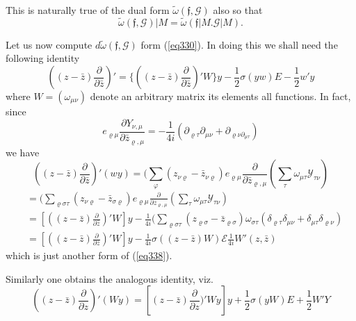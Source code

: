 This is naturally true of the dual form $\tilde{\omega } (\mathfrak{f},
\mathcal{G})$ also so that  
\begin{equation*}
\tilde{\omega} (\mathfrak{f}, \mathcal{G}) | M = \tilde {\omega}
(\mathfrak{f} | M. \mathcal{G} | M ). \tag{337}\label{eq337}   
\end{equation*}

Let us now compute $d \tilde{\omega} (\mathfrak{f}, \mathcal{G})$ form
(\ref{eq330}). In doing this we shall need the following identity  
\begin{equation*}
((z - \bar{z}) \frac{\partial }{\partial \bar{z}})' = \{((z -
  \bar{z})\frac{\partial }{\partial \bar{z}})' W  \} y - \frac{1}{2 }
  \sigma (y w ) E- \frac{1}{2} w' y \tag{338}\label{eq338}   
\end{equation*}
where $W = (\omega_{\mu \nu })$ denote an arbitrary matrix its
elements all functions. In fact, since  
$$
e_{\varrho \mu } \frac{\partial Y_{\nu, \mu }}{\partial
  \bar{z}_{\varrho, \mu } } = - \frac{1}{4i} (\partial_{\varrho \tau}
\partial_{\mu  \nu } + \partial_{\varrho \nu \partial_{\mu  \tau}}) 
$$
we have 
$$
((z - \bar{z})\frac{\partial }{\partial \bar{z} })' (w y ) = (\sum_
\varphi (z_{\nu \varrho }- \bar z_{\nu \varrho }) e_{\varrho \mu  }
\frac{\partial }{\partial \bar{z}_{\varrho, \mu } } (\sum_\tau
\omega_{\mu \tau } \mathscr{Y}_{\tau \nu }) 
$$
\begin{align*}
& = ( \sum_{\varrho \sigma \tau } (z_{\nu \varrho } - \bar z_{\sigma
    \varrho }) e_{\varrho \mu  } \frac{\partial }{\partial
    \bar{z}_{\varrho, \mu } } (\sum_\tau \omega_{\mu \tau }
  \mathscr{Y}_{\tau \nu })\\ 
 & = [((z - \bar{z}) \frac{\partial }{\partial \bar{z} })' W] y -
  \frac{1}{4i} (\sum_{\varrho \sigma \tau } (z_{\varrho \sigma } -
  \bar{z}_{\varrho \sigma }) \omega_{\sigma \tau } (\delta_{\varrho
    \tau }\delta_{\mu \nu  } + \delta_{\mu  \tau } \delta_{\varrho \nu
  })\\ 
& = [((z - \bar{z}) \frac{\partial }{\partial \bar{z} })' W] y -
  \frac{1}{4i} \sigma ((z - \bar{z}) W ) \mathcal{E} \frac{1}{4i} W'
  (z, \bar{z}) 
\end{align*}\pageoriginale
which is just another form of (\ref{eq338}). 

Similarly one obtains the analogous identity, viz. 
\begin{equation*}
((z - \bar{z}) \frac{\partial }{\partial z })' (W y) = [(z - \bar{z})
    \frac{\partial }{\partial z })' W y] y + \frac{1}{2} \sigma (y W )
  E + \frac{1}{2} W'Y \tag{339}\label{eq339}   
\end{equation*}

